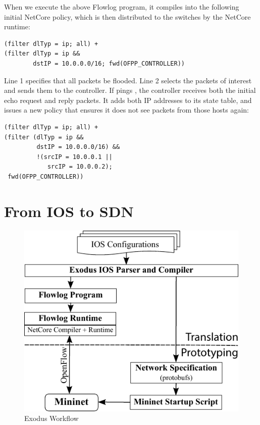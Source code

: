 When we execute the above Flowlog program, it compiles into the following
initial NetCore policy, which is then distributed to the switches by the NetCore runtime:
\begin{lstlisting}[label=lst:flowlog-netcore-1,language=Flowlog]
(filter dlTyp = ip; all) +
(filter dlTyp = ip &&
        dstIP = 10.0.0.0/16; fwd(OFPP_CONTROLLER))
\end{lstlisting} 
Line 1 specifies that all  packets be flooded. Line 2 selects the packets
of interest and sends them to the controller.
If  pings , the controller receives
both the initial echo request and reply packets. It adds both IP addresses to its state
table, and issues a new policy that ensures it does not see packets from those
hosts again:
\begin{lstlisting}[label=lst:flowlog-netcore-2,language=Flowlog]
(filter dlTyp = ip; all) +
(filter (dlTyp = ip && 
         dstIP = 10.0.0.0/16) &&
         !(srcIP = 10.0.0.1 ||
            srcIP = 10.0.0.2);
 fwd(OFPP_CONTROLLER))
\end{lstlisting}

\section{From IOS to SDN}
\label{sec:translating}

\begin{figure}
  \centering
  \includegraphics[scale=0.9]{figs/workflow.pdf}
  \vspace{0.2cm}
  \caption{Exodus Workflow}
  \label{fig:workflow}
\end{figure}


